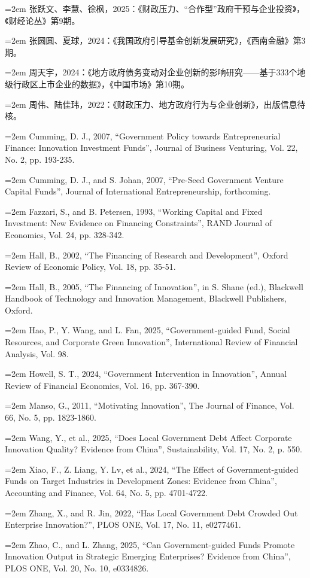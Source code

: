 \documentclass[UTF8,a4paper,zihao=5,fontset=fandol]{ctexart}
\newcommand{\ERJRef}[1]{%
  \par\noindent\hspace*{2em}\hangindent=2em\hangafter=1 {#1}\par%
}
\begin{document}
{\ERJRef{张跃文、李慧、徐枫，2025：《财政压力、“合作型”政府干预与企业投资》，《财经论丛》第9期。}
\ERJRef{张圆圆、夏球，2024：《我国政府引导基金创新发展研究》，《西南金融》第3期。}
\ERJRef{周天宇，2024：《地方政府债务变动对企业创新的影响研究——基于333个地级行政区上市企业的数据》，《中国市场》第10期。}
\ERJRef{周伟、陆佳玮，2022：《财政压力、地方政府行为与企业创新》，出版信息待核。}
\ERJRef{Cumming, D. J., 2007, “Government Policy towards Entrepreneurial Finance: Innovation Investment Funds”, Journal of Business Venturing, Vol. 22, No. 2, pp. 193-235.}
\ERJRef{Cumming, D. J., and S. Johan, 2007, “Pre-Seed Government Venture Capital Funds”, Journal of International Entrepreneurship, forthcoming.}
\ERJRef{Fazzari, S., and B. Petersen, 1993, “Working Capital and Fixed Investment: New Evidence on Financing Constraints”, RAND Journal of Economics, Vol. 24, pp. 328-342.}
\ERJRef{Hall, B., 2002, “The Financing of Research and Development”, Oxford Review of Economic Policy, Vol. 18, pp. 35-51.}
\ERJRef{Hall, B., 2005, “The Financing of Innovation”, in S. Shane (ed.), Blackwell Handbook of Technology and Innovation Management, Blackwell Publishers, Oxford.}
\ERJRef{Hao, P., Y. Wang, and L. Fan, 2025, “Government-guided Fund, Social Resources, and Corporate Green Innovation”, International Review of Financial Analysis, Vol. 98.}
\ERJRef{Howell, S. T., 2024, “Government Intervention in Innovation”, Annual Review of Financial Economics, Vol. 16, pp. 367-390.}
\ERJRef{Manso, G., 2011, “Motivating Innovation”, The Journal of Finance, Vol. 66, No. 5, pp. 1823-1860.}
\ERJRef{Wang, Y., et al., 2025, “Does Local Government Debt Affect Corporate Innovation Quality? Evidence from China”, Sustainability, Vol. 17, No. 2, p. 550.}
\ERJRef{Xiao, F., Z. Liang, Y. Lv, et al., 2024, “The Effect of Government-guided Funds on Target Industries in Development Zones: Evidence from China”, Accounting and Finance, Vol. 64, No. 5, pp. 4701-4722.}
\ERJRef{Zhang, X., and R. Jin, 2022, “Has Local Government Debt Crowded Out Enterprise Innovation?”, PLOS ONE, Vol. 17, No. 11, e0277461.}
\ERJRef{Zhao, C., and L. Zhang, 2025, “Can Government-guided Funds Promote Innovation Output in Strategic Emerging Enterprises? Evidence from China”, PLOS ONE, Vol. 20, No. 10, e0334826.}
}

\vspace{2\baselineskip}
\end{document}
